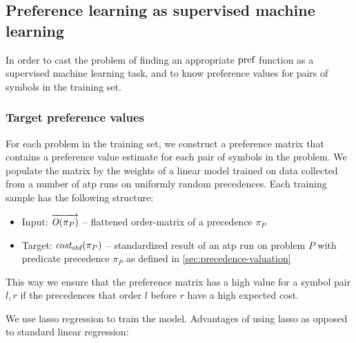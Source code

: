\subsection{Preference learning as supervised machine learning}

In order to cast the problem of finding an appropriate \(\operatorname{pref}\) function
as a supervised machine learning task,
and to know preference values for pairs of symbols in the training set.

\subsubsection{Target preference values}
\label{sec:target-preference-values}

For each problem in the training set, we construct a preference matrix that contains a preference
value estimate for each pair of symbols in the problem.
We populate the matrix by the weights of a linear model trained on data
collected from a number of \gls{atp} runs on uniformly random precedences.
Each training sample has the following structure:

\begin{itemize}
	\item Input: \(\overrightarrow{\operatorname{\mathit{O}}(\pi_P)}\) --
	flattened \gls{order-matrix} of a precedence \(\pi_P\)
	\item Target: \(\operatorname{\mathit{cost_{std}}}(\pi_P)\) --
	standardized result of an \gls{atp} run on problem \(P\) with predicate precedence \(\pi_P\)
	as defined in \autoref{sec:precedence-valuation}
\end{itemize}

This way we ensure that the preference matrix has a high value for a symbol pair \(l, r\)
if the precedences that order \(l\) before \(r\) have a high expected cost.

We use lasso regression \cite{?} to train the model.
Advantages of using lasso as opposed to standard linear regression\cite{?}:

